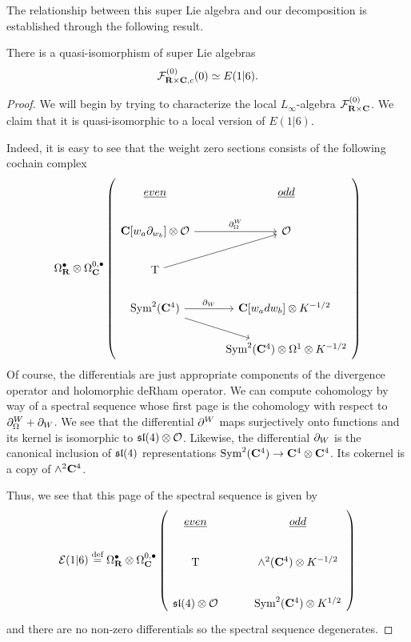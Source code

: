 \documentclass[../main.tex]{subfiles}
\begin{document}
The relationship between this super Lie algebra and our decomposition is established through the following result.





\begin{prop}
There is a quasi-isomorphism of super Lie algebras
\[
\mathcal{F}^{(0)}_{\mathbf{R}\times \mathbf{C}, c}  (0) \simeq E(1|6).
\]
\end{prop}
\begin{proof}
We will begin by trying to characterize the local $L_\infty$-algebra $\mathcal{F}^{(0)}_{\mathbf{R}\times \mathbf{C}}$. We claim that it is quasi-isomorphic to a local version of $E(1|6)$. 

Indeed, it is easy to see that the weight zero sections consists of the following cochain complex 
\begin{equation}
\Omega^\bullet _\R \otimes \Omega^{0,\bullet}_\C \left (
\begin{tikzcd}
\ul{even} & \ul{odd} \\
\C[w_a\del_{w_b}]\otimes \mc O\ar[r, "\del^W_\Omega"]  & \mc O \\ 
\T \ar[ur] & \\
\Sym^2 (\C^4)\ar[r, "\del_W"]\ar[dr] & \C[w_adw_b] \otimes K^{-1/2}\ \\
& \Sym^2 (\C^4)\otimes \Omega^1\otimes K^{-1/2}
\end{tikzcd} \right)
\end{equation}
Of course, the differentials are just appropriate components of the divergence operator and holomorphic deRham operator. We can compute cohomology by way of a spectral sequence whose first page is the cohomology with respect to $\partial^W_\Omega + \partial_W$. We see that the differential $\partial^W$ maps surjectively onto functions and its kernel is isomorphic to $\mathfrak{sl}(4)\otimes \mathcal{O}$. Likewise, the differential $\partial_W$ is the canonical inclusion of $\mathfrak{sl}(4)$ representations $\text{Sym}^2 (\mathbf{C}^4)\to \mathbf{C}^4\otimes \mathbf{C}^4$. Its cokernel is a copy of $\wedge^2 \mathbf{C}^4$. 

Thus, we see that this page of the spectral sequence is given by
\begin{equation}
\mc E(1|6) \define \Omega^\bullet _\R \otimes \Omega^{0,\bullet}_\C \left (
\begin{tikzcd}
\ul{even} & \ul{odd} \\
\T & \wedge^2 (\C^4) \otimes K^{-1/2} \\
\mf {sl}(4)\otimes \mc O & \Sym^2 (\C^4)\otimes K^{1/2}
\end{tikzcd} \right)
\end{equation}
and there are no non-zero differentials so the spectral sequence degenerates.


\end{proof}
\end{document}
